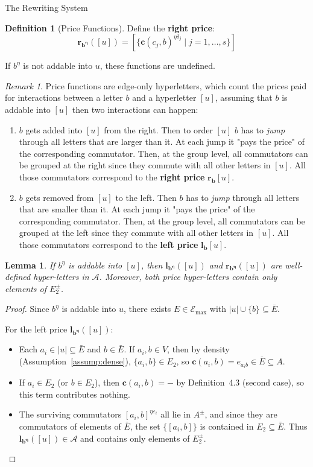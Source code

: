 \documentclass{article}
\newtheorem{lemma}[theorem]{Lemma}
\theoremstyle{definition}
\newtheorem{definition}[theorem]{Definition}
\theoremstyle{remark}
\newtheorem{remark}[theorem]{Remark}
\theoremstyle{theorem}
\theoremstyle{definition}
\begin{document}
\begin{section}{The Rewriting System}
\begin{definition}[Price Functions]
Define the \textbf{right price}:
$$\mathbf{r_{b^{\eta}}}([u]) = [\{\mathbf{c}(c_j, b)^{\eta \delta_j} \mid j=1,\ldots,s \}]$$

If $b^{\eta}$ is not addable into $u$, these functions are undefined.
\end{definition}

\begin{remark}
Price functions are edge-only hyperletters, which count the prices paid for interactions between a letter $b$ and a hyperletter $[u]$, assuming that $b$ is addable into $[u]$ then two interactions can happen:
\begin{enumerate}
    \item $b$ gets added into $[u]$ from the right. Then to order $[u]$ $b$ has to \textit{jump} through all letters that are larger than it. At each jump it "pays the price" of the corresponding commutator. Then, at the group level, all commutators can be grouped at the right since they commute with all other letters in $[u]$. All those commutators correspond to the \textbf{right price} $\mathbf{r_{b}}[u]$.
    \item $b$ gets removed from $[u]$ to the left. Then $b$ has to \textit{jump} through all letters that are smaller than it. At each jump it "pays the price" of the corresponding commutator. Then, at the group level, all commutators can be grouped at the left since they commute with all other letters in $[u]$. All those commutators correspond to the \textbf{left price} $\mathbf{l_{b}}[u]$.
\end{enumerate}
\end{remark}

\begin{lemma}\label{lem:price_welldef}
If $b^{\eta}$ is addable into $[u]$, then $\mathbf{l_{b^{\eta}}}([u])$ and $\mathbf{r_{b^{\eta}}}([u])$ are well-defined hyper-letters in $\mathcal{A}$. Moreover, both price hyper-letters contain only elements of $E_2^{\pm}$.
\end{lemma}

\begin{proof}
Since $b^\eta$ is addable into $u$, there exists $E \in \mathcal{E}_{\max}$ with $|u| \cup \{b\} \subseteq \bar{E}$.

For the left price $\mathbf{l_{b^{\eta}}}([u])$:
\begin{itemize}
    \item Each $a_i \in |u| \subseteq \bar{E}$ and $b \in \bar{E}$. If $a_i, b \in V$, then by density (Assumption~\ref{assump:dense}), $\{a_i, b\} \in E_2$, so $\mathbf{c}(a_i,b)= e_{a_i b} \in \overline{E} \subseteq A$.
    \item If $a_i \in E_2$ (or $b \in E_2$), then $\mathbf{c}(a_i,b) = -$ by Definition~4.3 (second case), so this term contributes nothing.
    \item The surviving commutators $[a_i, b]^{\eta\varepsilon_i}$ all lie in $A^\pm$, and since they are commutators of elements of $\bar{E}$, the set $\{[a_i,b]\}$ is contained in $E_2 \subseteq \bar{E}$. Thus $\mathbf{l_{b^\eta}}([u]) \in \mathcal{A}$ and contains only elements of $E_2^\pm$.
\end{itemize}


\end{proof}
\end{section}
\end{document}
